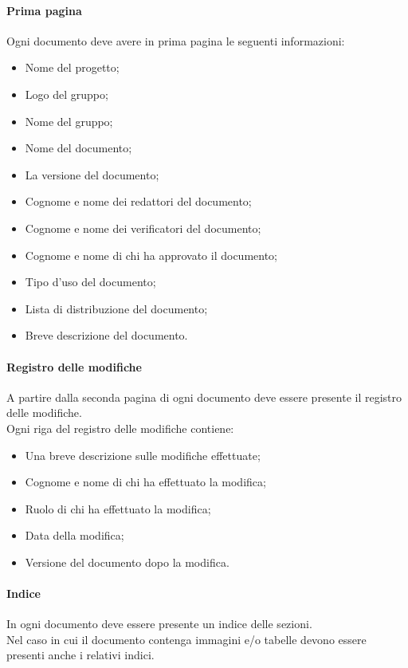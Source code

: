 \paragraph{Prima pagina}
Ogni documento deve avere in prima pagina le seguenti informazioni:
\begin{itemize}
	\item Nome del progetto;
	\item Logo del gruppo;
	\item Nome del gruppo;
	\item Nome del documento;
	\item La versione del documento;
	\item Cognome e nome dei redattori del documento;
	\item Cognome e nome dei verificatori del documento;
	\item Cognome e nome di chi ha approvato il documento;
	\item Tipo d'uso del documento;
	\item Lista di distribuzione del documento;
	\item Breve descrizione del documento.
\end{itemize}
\paragraph{Registro delle modifiche}
A partire dalla seconda pagina di ogni documento deve essere presente il registro delle modifiche.\\
Ogni riga del registro delle modifiche contiene:
\begin{itemize}
	\item Una breve descrizione sulle modifiche effettuate;
	\item Cognome e nome di chi ha effettuato la modifica;
	\item Ruolo di chi ha effettuato la modifica;
	\item Data della modifica;
	\item Versione del documento dopo la modifica.
\end{itemize}

\paragraph{Indice}
In ogni documento deve essere presente un indice delle sezioni.\\
Nel caso in cui il documento contenga immagini e/o tabelle devono essere presenti anche i relativi indici.

